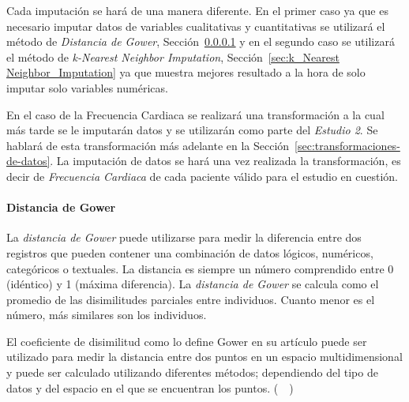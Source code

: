 Cada imputación se hará de una manera diferente. En el primer caso ya que es necesario imputar datos de variables cualitativas y cuantitativas se utilizará el método de \textit{Distancia de Gower}, Sección~\ref{sec:gower_distance} y en el segundo caso se utilizará el método de \textit{k-Nearest Neighbor Imputation}, Sección~\ref{sec:k_Nearest Neighbor_Imputation} ya que muestra mejores resultado a la hora de solo imputar solo variables numéricas.

En el caso de la Frecuencia Cardiaca se realizará una transformación a la cual más tarde se le imputarán datos y se utilizarán como parte del \textit{Estudio 2}. Se hablará de esta transformación más adelante en la Sección~\ref{sec:transformaciones-de-datos}. La imputación de datos se hará una vez realizada la transformación, es decir de \textit{Frecuencia Cardiaca} de cada paciente válido para el estudio en cuestión.

\paragraph{Distancia de Gower}\label{sec:gower_distance}

La \textit{distancia de Gower} puede utilizarse para medir la diferencia entre dos registros que pueden contener una combinación de datos lógicos, numéricos, categóricos o textuales. La distancia es siempre un número comprendido entre 0 (idéntico) y 1 (máxima diferencia). La \textit{distancia de Gower} se calcula como el promedio de las disimilitudes parciales entre individuos. Cuanto menor es el número, más similares son los individuos.

El coeficiente de disimilitud como lo define Gower en su artículo puede ser utilizado para medir la distancia entre dos puntos en un espacio multidimensional y puede ser calculado utilizando diferentes métodos; dependiendo del tipo de datos y del espacio en el que se encuentran los puntos. (~\cite{Gower1971}~)

